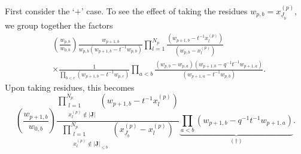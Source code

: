 \documentclass{amsart}
\newcommand{\Ju}{{\underline{J}}}
\theoremstyle{remark}
\numberwithin{thm}{section}
\numberwithin{equation}{section}
\begin{document}
First consider the `$+$' case.
To see the effect of taking the residues $w_{p,b}=x_{\Ju_b}^{(p)}$, we group together the factors
\begin{align*}
&\left(\frac{w_{p,b}}{w_{0,b}}\right)\frac{w_{p+1,b}}{w_{p,b}\left( w_{p+1,b}-t^{-1}w_{p,b} \right)}
\prod_{l=1}^{N_p}
\frac{\left( w_{p+1,b}-t^{-1}x_{l}^{(p)} \right)}
{\displaystyle\left( w_{p,b}-x_{l}^{(p)} \right)}\\
&\times
\frac{1}
{\displaystyle
\prod_{b<c}
\left( w_{p+1,b}-t^{-1}w_{p,c} \right)}
\prod_{a<b}\frac{
\displaystyle
\left( w_{p,b}-w_{p,a} \right)\left( w_{p+1,b}-q^{-1}t^{-1}w_{p+1,a} \right)}
{\left( w_{p+1,a}-t^{-1}w_{p,b} \right)}.
\end{align*}
Upon taking residues, this becomes
\begin{equation}
\left(\frac{w_{p+1,b}}{w_{0,b}}\right)
\frac{\displaystyle
\prod_{\substack{l=1\\x_{l}^{(p)}\not\in|\mathbf{\Ju}|}}^{N_p}
\left( w_{p+1,b}-t^{-1}x_{l}^{(p)} \right)}
{\displaystyle
\prod_{\substack{l=1\\x_{l}^{(p)}\not\in|\mathbf{\Ju}|_{\le b}}}^{N_p}
\left( x_{\Ju_b}^{(p)}-x_{l}^{(p)} \right)}
\underbrace{\prod_{a<b}\left( w_{p+1,b}-q^{-1}t^{-1}w_{p+1,a} \right)}_{(\dagger)}.
\label{APLeft}
\end{equation} 
\end{document}
